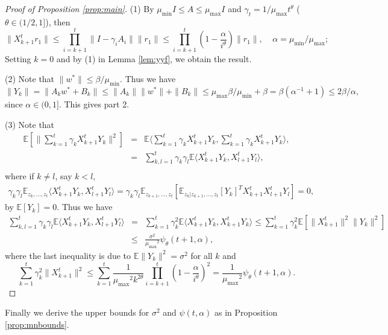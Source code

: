 \documentclass[twoside]{amsart}
\theoremstyle{theorem}
\theoremstyle{definition}
\theoremstyle{remark}
\def\amax{{\mu_{\max}}}
\def\amin{{\mu_{\min}} }
\newcommand{\DS}{\displaystyle}
\def\E{{\mathbb E}}        %
\def\<{{\langle}}
\def\>{{\rangle}}
\begin{document}
\begin{proof}[Proof of Proposition \ref{prop:main}]


(1) By $\amin I\leq A \leq \amax I$ and $\gamma_t=1/\amax t^\theta$ ($\theta\in (1/2,1]$), then
\begin{equation}\label{eq:Xk}
 \|X_{k+1}^t r_1\| \leq \prod_{i=k+1}^t \| I - \gamma_i A_i \| \|r_1\| \leq \prod_{i=k+1}^t \left( 1 - \frac{\alpha}{i^\theta} \right)\|r_1\|, \ \ \ \ \ \alpha=\amin/\amax;
\end{equation}
Setting $k=0$ and by (1) in Lemma \ref{lem:yyf}, we obtain the result.

(2) Note that $\DS \|w^\ast\|\leq \beta/\amin$. Thus we have
$$\|Y_k\|=\|A_k w^\ast + B_k\| \leq \|A_k\|\|w^\ast\|+\|B_k\| \leq \amax \beta/\amin + \beta= \beta(\alpha^{-1} +1)\leq 2\beta/\alpha,$$
since $\alpha\in(0,1]$. This gives part 2.

(3) Note that
\begin{eqnarray*}
\E [\|\sum_{k=1}^{t} \gamma_k X_{k+1}^tY_k \|^2] & = & \E\< \sum_{k=1}^{t} \gamma_k X_{k+1}^t Y_k, \sum_{k=1}^{t} \gamma_k X_{k+1}^t Y_k \>,  \\
& = &  \sum_{k, l =1}^{t} \gamma_k \gamma_l \E \< X_{k+1}^tY_k, X_{l+1}^tY_l \>, \\
\end{eqnarray*}
where if $k\neq l$, say $k<l$,
\begin{eqnarray*}
\gamma_k \gamma_l \E_{z_k,\ldots,z_{t}} \< X_{k+1}^tY_k , X_{l+1}^t Y_l \> = \gamma_k \gamma_l
\E_{z_{k+1},\ldots,z_{t}}[\E_{z_k|z_{k+1},\ldots,z_t} [Y_k]^T X_{k+1}^t  X_{l+1}^tY_l] = 0,
\end{eqnarray*}
by $\E[Y_k]=0$. Thus we have
\begin{eqnarray*}
\sum_{k, l =1}^{t} \gamma_k \gamma_l \E \< X_{k+1}^tY_k, X_{l+1}^tY_l \> & = & \sum_{k=1}^{t} \gamma_k^2 \E \< X_{k+1}^tY_k, X_{k+1}^tY_k \>  \leq
\sum_{k=1}^{t} \gamma_k^2 \E[\|X_{k+1}^t\|^2  \|Y_k \|^2] \\
& \leq & \frac{\sigma^2}{\amax^2} \psi_\theta(t+1,\alpha),
\end{eqnarray*}
where the last inequality is due to $\E\|Y_k\|^2=\sigma^2$ for all
$k$ and
$$\DS \sum_{k=1}^t \gamma_k^2 \|X_{k+1}^t\|^2 \leq  \sum_{k=1}^t \frac{1}{\amax^2
k^{2\theta}}\prod_{i=k+1}^t \left( 1 - \frac{\alpha}{i^\theta}
\right)^2 = \frac{1}{\amax^2} \psi_\theta(t+1,\alpha). $$
\end{proof}

Finally we derive the upper bounds for $\sigma^2$ and $\psi(t,\alpha)$ as in Proposition \ref{prop:mnbounds}.
\end{document}
